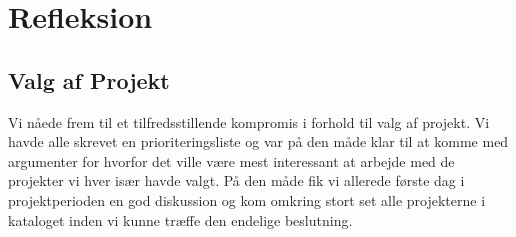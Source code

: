 %
%

\section{Refleksion}

\subsection{Valg af Projekt}
Vi nåede frem til et tilfredsstillende kompromis i forhold til valg af projekt. Vi havde alle skrevet en prioriteringsliste og var på den måde klar til at komme med argumenter for hvorfor det ville være mest interessant at arbejde med de projekter vi hver især havde valgt. På den måde fik vi allerede første dag i projektperioden en god diskussion og kom omkring stort set alle projekterne i kataloget inden vi kunne træffe den endelige beslutning. 

